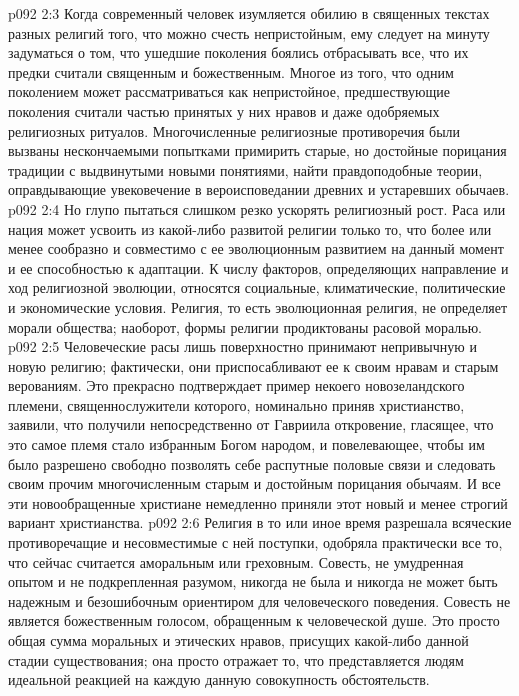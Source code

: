 \vs p092 2:3 Когда современный человек изумляется обилию в священных текстах разных религий того, что можно счесть непристойным, ему следует на минуту задуматься о том, что ушедшие поколения боялись отбрасывать все, что их предки считали священным и божественным. Многое из того, что одним поколением может рассматриваться как непристойное, предшествующие поколения считали частью принятых у них нравов и даже одобряемых религиозных ритуалов. Многочисленные религиозные противоречия были вызваны нескончаемыми попытками примирить старые, но достойные порицания традиции с выдвинутыми новыми понятиями, найти правдоподобные теории, оправдывающие увековечение в вероисповедании древних и устаревших обычаев.
\vs p092 2:4 Но глупо пытаться слишком резко ускорять религиозный рост. Раса или нация может усвоить из какой\hyp{}либо развитой религии только то, что более или менее сообразно и совместимо с ее эволюционным развитием на данный момент и ее способностью к адаптации. К числу факторов, определяющих направление и ход религиозной эволюции, относятся социальные, климатические, политические и экономические условия. Религия, то есть эволюционная религия, не определяет морали общества; наоборот, формы религии продиктованы расовой моралью.
\vs p092 2:5 Человеческие расы лишь поверхностно принимают непривычную и новую религию; фактически, они приспосабливают ее к своим нравам и старым верованиям. Это прекрасно подтверждает пример некоего новозеландского племени, священнослужители которого, номинально приняв христианство, заявили, что получили непосредственно от Гавриила откровение, гласящее, что это самое племя стало избранным Богом народом, и повелевающее, чтобы им было разрешено свободно позволять себе распутные половые связи и следовать своим прочим многочисленным старым и достойным порицания обычаям. И все эти новообращенные христиане немедленно приняли этот новый и менее строгий вариант христианства.
\vs p092 2:6 Религия в то или иное время разрешала всяческие противоречащие и несовместимые с ней поступки, одобряла практически все то, что сейчас считается аморальным или греховным. Совесть, не умудренная опытом и не подкрепленная разумом, никогда не была и никогда не может быть надежным и безошибочным ориентиром для человеческого поведения. Совесть не является божественным голосом, обращенным к человеческой душе. Это просто общая сумма моральных и этических нравов, присущих какой\hyp{}либо данной стадии существования; она просто отражает то, что представляется людям идеальной реакцией на каждую данную совокупность обстоятельств.
